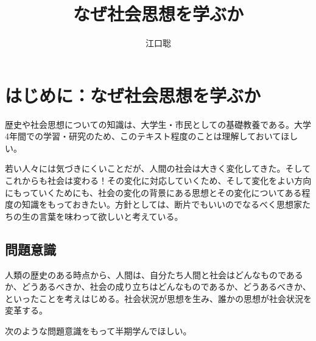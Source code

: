 \documentclass[autodetect-engine,dvipdfmx-if-dvi,ja=standard]{bxjsarticle} \usepackage{mystyle}
\author{江口聡}
\title{なぜ社会思想を学ぶか}
\begin{document}
\maketitle

\else
\chapter*{はじめに：なぜ社会思想を学ぶか}
\fi
{}

歴史や社会思想についての知識は、大学生・市民としての基礎教養である。大学4年間での学習・研究のため、このテキスト程度のことは理解しておいてほしい。

若い人々には気づきにくいことだが、人間の社会は大きく変化してきた。そしてこれからも社会は変わる！その変化に対応していくため、そして変化をよい方向にもっていくためにも、社会の変化の背景にある思想とその変化についてある程度の知識をもっておきたい。方針としては、断片でもいいのでなるべく思想家たちの生の言葉を味わって欲しいと考えている。







\section*{問題意識}


人類の歴史のある時点から、人間は、自分たち人間と社会はどんなものであるか、どうあるべきか、社会の成り立ちはどんなものであるか、どうあるべきか、といったことを考えはじめる。社会状況が思想を生み、誰かの思想が社会状況を変革する。





次のような問題意識をもって半期学んでほしい。
\end{document}
